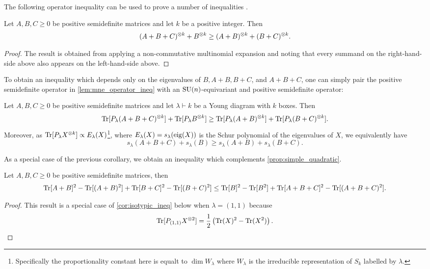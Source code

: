 \documentclass[notitlepage, 10pt]{article}
\begin{document}
The following operator inequality can be used to prove a number of inequalities \cite[Lemma 2.2]{tie2011rearrangement}.
\begin{lem}
    \label{lem:mne_operator_ineq}
    Let $A,B,C \geq 0$ be positive semidefinite matrices and let $k$ be a positive integer.
    Then
    \begin{equation}
        (A+B+C)^{\otimes k} + B^{\otimes k} \geq (A+B)^{\otimes k} + (B+C)^{\otimes k}.
    \end{equation}
\end{lem}
\begin{proof}
    The result is obtained from applying a non-commutative multinomial expansion and noting that every summand on the right-hand-side above also appears on the left-hand-side above.
\end{proof}
To obtain an inequality which depends only on the eigenvalues of $B, A+B, B+C$, and $A+B+C$, one can simply pair the positive semidefinite operator in \cref{lem:mne_operator_ineq} with an $\operatorname{SU}(n)$-equivariant and positive semidefinite operator:
\begin{cor}
    \label{cor:isotypic_ineq}
    Let $A,B,C \geq 0$ be positive semidefinite matrices and let $\lambda \vdash k$ be a Young diagram with $k$ boxes.
    Then
    \begin{equation}
        \operatorname{Tr}[P_{\lambda}(A+B+C)^{\otimes k}] + \operatorname{Tr}[P_{\lambda}B^{\otimes k}] \geq \operatorname{Tr}[P_{\lambda}(A+B)^{\otimes k}] + \operatorname{Tr}[P_{\lambda}(B+C)^{\otimes k}].
    \end{equation}
    Moreover, as $\operatorname{Tr}[P_{\lambda} X^{\otimes k}] \propto E_\lambda(X)$\footnote{Specifically the proportionality constant here is equalt to $\dim W_{\lambda}$ where $W_{\lambda}$ is the irreducible representation of $S_k$ labelled by $\lambda$.}, where $E_{\lambda}(X) = s_{\lambda}(\operatorname{eig}(X))$ is the Schur polynomial of the eigenvalues of $X$, we equivalently have
    \begin{equation}
        s_{\lambda}(A+B+C) + s_{\lambda}(B) \geq s_{\lambda}(A+B) + s_{\lambda}(B+C).
    \end{equation}
\end{cor}
As a special case of the previous corollary, we obtain an inequality which complements \cref{prop:simple_quadratic}.
\begin{cor}
    \label{lem:quadratic_ineq_dual}
    Let $A,B,C \geq 0$ be positive semidefinite matrices, then
    \begin{equation}
        \operatorname{Tr}[A+B]^2 - \operatorname{Tr}[(A+B)^2] + \operatorname{Tr}[B+C]^2 - \operatorname{Tr}[(B+C)^2] \leq \operatorname{Tr}[B]^2 - \operatorname{Tr}[B^2] + \operatorname{Tr}[A+B+C]^2 - \operatorname{Tr}[(A+B+C)^2].
    \end{equation}
\end{cor}
\begin{proof}
    This result is a special case of \cref{cor:isotypic_ineq} below when $\lambda = (1,1)$ because
    \begin{equation}
        \operatorname{Tr}[P_{(1,1)} X^{\otimes 2}] = \frac{1}{2}\left( \operatorname{Tr}(X)^2  - \operatorname{Tr}(X^2) \right).
    \end{equation}
\end{proof}
\end{document}
